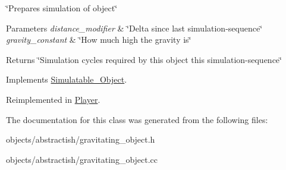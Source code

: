 \char`\"{}\+Prepares simulation of object\char`\"{} 


\begin{DoxyParams}{Parameters}
{\em distance\+\_\+modifier} & \char`\"{}\+Delta since last simulation-\/sequence\char`\"{} \\
\hline
{\em gravity\+\_\+constant} & \char`\"{}\+How much high the gravity is\char`\"{} \\
\hline
\end{DoxyParams}
\begin{DoxyReturn}{Returns}
\char`\"{}\+Simulation cycles required by this object this simulation-\/sequence\char`\"{} 
\end{DoxyReturn}


Implements \hyperlink{classSimulatable__Object_abe7c02fe250ef5be42011890d8a7b37b}{Simulatable\+\_\+\+Object}.



Reimplemented in \hyperlink{classPlayer_a1480bbfb767687380ad6a2bf294cdcc8}{Player}.



The documentation for this class was generated from the following files\+:\begin{DoxyCompactItemize}
\item 
objects/abstractish/gravitating\+\_\+object.\+h\item 
objects/abstractish/gravitating\+\_\+object.\+cc\end{DoxyCompactItemize}
